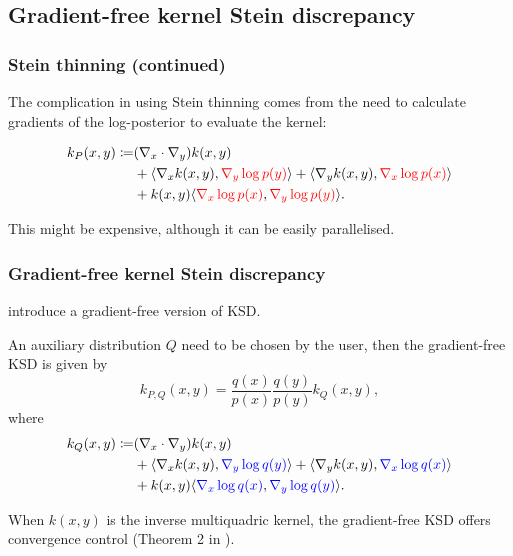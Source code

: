 \documentclass{beamer}
\begin{document}
\subsection{Gradient-free kernel Stein discrepancy}

\begin{frame}
\frametitle{Stein thinning (continued)}

The complication in using Stein thinning comes from the need to calculate gradients of the log-posterior to evaluate the kernel:

\begin{equation*}
\begin{aligned}
k_P(x, y) \coloneq 
&(\nabla_x\cdot\nabla_y) k(x,y) \\
&+ \langle \nabla_x k(x, y), \textcolor{red}{\nabla_y \log p(y)} \rangle + \langle \nabla_y k(x, y), \textcolor{red}{\nabla_x \log p(x)} \rangle \\
&+ k(x, y) \langle \textcolor{red}{\nabla_x \log p(x)}, \textcolor{red}{\nabla_y \log p(y)} \rangle.
\end{aligned}
\end{equation*}

This might be expensive, although it can be easily parallelised.

\end{frame}



\begin{frame}
\frametitle{Gradient-free kernel Stein discrepancy}

\cite{fisherGradientFreeKernelStein2024} introduce a gradient-free version of KSD.

An auxiliary distribution $Q$ need to be chosen by the user, then the gradient-free KSD is given by
\begin{equation*}
k_{P,Q}(x, y) = \frac{q(x)}{p(x)} \frac{q(y)}{p(y)} k_Q(x, y),
\end{equation*}
where
\begin{equation*}
\begin{aligned}
k_Q(x, y) \coloneq 
&(\nabla_x\cdot\nabla_y) k(x,y) \\
&+ \langle \nabla_x k(x, y), \textcolor{blue}{\nabla_y \log q(y)} \rangle + \langle \nabla_y k(x, y), \textcolor{blue}{\nabla_x \log q(x)} \rangle \\
&+ k(x, y) \langle \textcolor{blue}{\nabla_x \log q(x)}, \textcolor{blue}{\nabla_y \log q(y)} \rangle.
\end{aligned}
\end{equation*}

When $k(x,y)$ is the inverse multiquadric kernel, the gradient-free KSD offers convergence control (Theorem 2 in \cite{fisherGradientFreeKernelStein2024}).

\end{frame}
\end{document}
